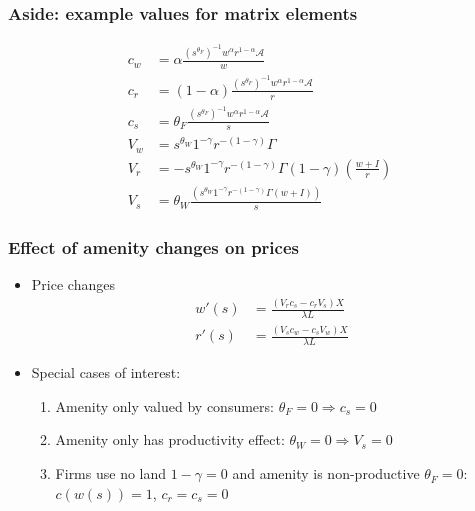\documentclass[10pt,notes=hide]{beamer}
\begin{document}
\begin{frame}
\frametitle{Aside: example values for matrix elements}
\begin{align*}
c_w &= \alpha \frac{(s^{\theta_F})^{-1}w^\alpha r^{1-\alpha} \mathcal{A}}{w} \\
c_r &= (1-\alpha) \frac{(s^{\theta_F})^{-1}w^\alpha r^{1-\alpha} \mathcal{A}}{r} \\
c_s &= \theta_F \frac{ (s^{\theta_F})^{-1}w^\alpha r^{1-\alpha} \mathcal{A}}{s} \\
V_w &=s^{\theta_W} 1^{-\gamma} r^{-(1-\gamma)}  \Gamma \\
V_r &= -s^{\theta_W} 1^{-\gamma} r^{-(1-\gamma)}\Gamma (1-\gamma)\left(\frac{w + I}{r}\right)   \\
V_s &= \theta_W \frac{\left(  s^{\theta_W} 1^{-\gamma} r^{-(1-\gamma)}\Gamma  \left(w + I\right) \right)}{s}
\end{align*}
\end{frame}
\begin{frame}
\frametitle{Effect of amenity changes on prices}
\begin{itemize}
\item Price changes
\begin{align*}
w'(s) &= \frac{(V_rc_s - c_rV_s) X}{ \lambda L} \\
r'(s) &= \frac{(V_sc_w - c_sV_w) X}{ \lambda L} 
\end{align*}
\item Special cases of interest:
\begin{enumerate}
\item Amenity only valued by consumers: $\theta_F=0 \Rightarrow c_s = 0$
\item Amenity only has productivity effect: $\theta_W=0 \Rightarrow  V_s = 0$
\item Firms use no land $1-\gamma=0$ and amenity is non-productive $\theta_F=0$: $c(w(s))=1$, $c_r = c_s = 0$
\end{enumerate}
\end{itemize}
\end{frame}
\end{document}
